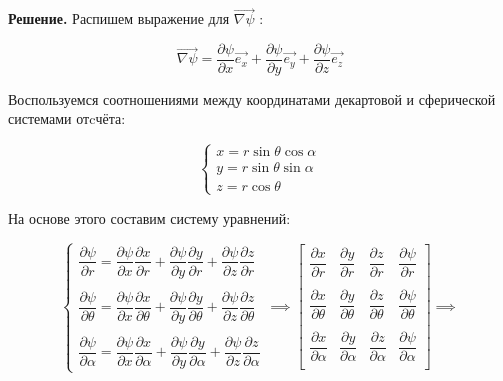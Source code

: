\documentclass[a4paper, 12pt]{article}
\begin{document}
	\quad \textbf{Решение.} Распишем выражение для $\vec{\nabla\psi}$ :
	
	\begin{equation}
		\vec{\nabla \psi} = \dfrac{\partial\psi}{\partial x} \vec{e_x} + \dfrac{\partial \psi}{\partial y} \vec{e_y} + \dfrac{\partial \psi}{\partial z} \vec{e_z} 
	\end{equation}
	
	\quad Воспользуемся соотношениями между координатами декартовой и сферической системами отcчёта: 
	
	\begin{equation}
		\begin{cases}
			x = r\sin\theta\cos\alpha  \\
			y = r\sin\theta\sin\alpha  \\
			z = r\cos\theta
		\end{cases}
	\end{equation}
	
	\quad На основе этого составим систему уравнений: 
	
	\begin{equation}
		\begin{cases}
			\dfrac{\partial \psi}{\partial r} = \dfrac{\partial \psi}{\partial x} \dfrac{\partial x}{\partial r} + \dfrac{\partial \psi}{\partial y} \dfrac{\partial y}{\partial r} + \dfrac{\partial \psi}{\partial z}\dfrac{\partial z}{\partial r}\\
			\\
			\dfrac{\partial \psi}{\partial \theta} = \dfrac{\partial \psi}{\partial x} \dfrac{\partial x}{\partial \theta} + \dfrac{\partial\psi}{\partial y} \dfrac{\partial y}{\partial \theta} + \dfrac{\partial \psi}{\partial z} \dfrac{\partial z}{\partial \theta}\\
			\\
			\dfrac{\partial \psi}{\partial \alpha} = \dfrac{\partial \psi}{\partial x} \dfrac{\partial x}{\partial \alpha} + \dfrac{\partial\psi}{\partial y} \dfrac{\partial y}{\partial \alpha} + \dfrac{\partial \psi}{\partial z} \dfrac{\partial z}{\partial \alpha}
		\end{cases} \implies \left[ \begin{array} {ccc|c}
		\dfrac{\partial x}{\partial r} & \dfrac{\partial y}{\partial r} & \dfrac{\partial z}{\partial r} & \dfrac{\partial \psi}{\partial r} \\
		& & & \\
		\dfrac{\partial x}{\partial \theta} & \dfrac{\partial y}{\partial \theta} & \dfrac{\partial z}{\partial \theta} & \dfrac{\partial\psi}{\partial\theta} \\
		& & & \\
		 \dfrac{\partial x}{\partial \alpha} & \dfrac{\partial y}{\partial \alpha} & \dfrac{\partial z}{\partial \alpha} & \dfrac{\partial\psi}{\partial\alpha} \\
		\end{array} \right] \implies 
	\end{equation}
	
\end{document}
